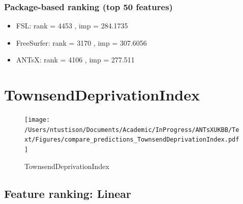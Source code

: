 \documentclass[
  10pt,
]{article}
\begin{document}
\hypertarget{package-based-ranking-top-50-features-4}{%
\subsubsection{Package-based ranking (top 50
features)}\label{package-based-ranking-top-50-features-4}}

\begin{itemize}
\item
  FSL: rank = 4453 , imp = 284.1735
\item
  FreeSurfer: rank = 3170 , imp = 307.6056
\item
  ANTsX: rank = 4106 , imp = 277.511
\end{itemize}

\clearpage

\hypertarget{townsenddeprivationindex}{%
\section{TownsendDeprivationIndex}\label{townsenddeprivationindex}}

\begin{figure}
\centering
\texttt{[image: /Users/ntustison/Documents/Academic/InProgress/ANTsXUKBB/Text/Figures/compare\_predictions\_TownsendDeprivationIndex.pdf]}
\caption{TownsendDeprivationIndex}
\end{figure}

\hypertarget{feature-ranking-linear-5}{%
\subsection{Feature ranking: Linear}\label{feature-ranking-linear-5}}
\end{document}
